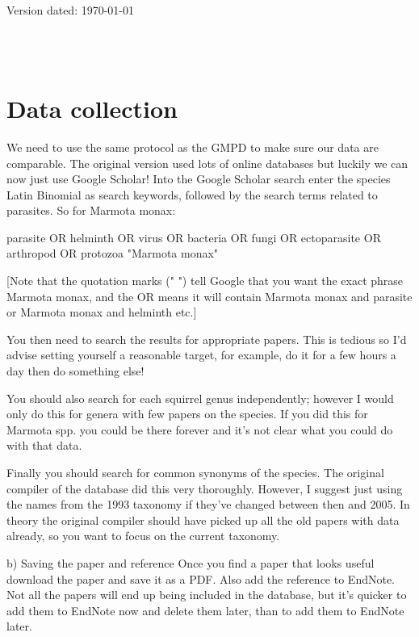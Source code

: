 \documentclass[a4paper,11pt]{article}
\begin{document}
\begin{flushright}
Version dated: \today
\end{flushright}
\begin{center}

\\
\bigskip
\\

\end{center}

\section{Data collection}
We need to use the same protocol as the GMPD to make sure our data are comparable. The original version used lots of online databases but luckily we can now just use Google Scholar! Into the Google Scholar search enter the species Latin Binomial as search keywords, followed by the search terms related to parasites. So for Marmota monax:

parasite OR helminth OR virus OR bacteria OR fungi OR ectoparasite OR arthropod OR protozoa "Marmota monax"

[Note that the quotation marks (" ") tell Google that you want the exact phrase Marmota monax, and the OR means it will contain Marmota monax and parasite or Marmota monax and helminth etc.]

You then need to search the results for appropriate papers. This is tedious so I’d advise setting yourself a reasonable target, for example, do it for a few hours a day then do something else!

You should also search for each squirrel genus independently; however I would only do this for genera with few papers on the species. If you did this for Marmota spp. you could be there forever and it’s not clear what you could do with that data.

Finally you should search for common synonyms of the species. The original compiler of the database did this very thoroughly. However, I suggest just using the names from the 1993 taxonomy if they’ve changed between then and 2005. In theory the original compiler should have picked up all the old papers with data already, so you want to focus on the current taxonomy. 

b) Saving the paper and reference
Once you find a paper that looks useful download the paper and save it as a PDF. Also add the reference to EndNote. Not all the papers will end up being included in the database, but it’s quicker to add them to EndNote now and delete them later, than to add them to EndNote later.
\end{document}
